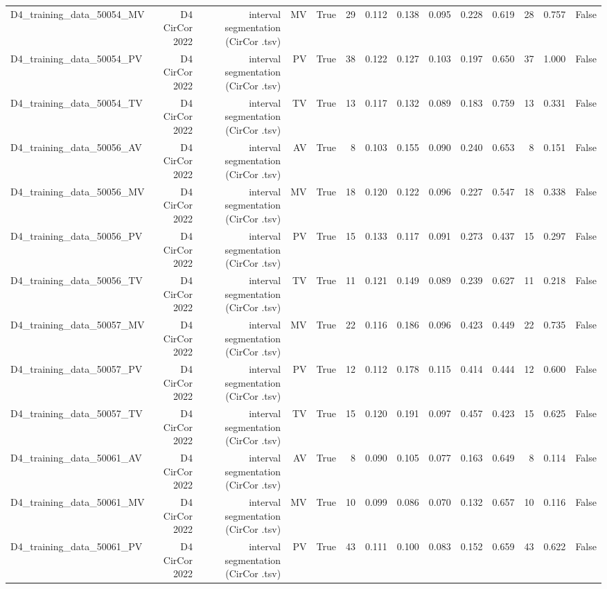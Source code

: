\begin{table}[htbp]
\begin{tabular}{lrrrrrrrrrrrrr}
    D4\_training\_data\_50054\_MV & D4 CirCor 2022 & interval segmentation (CirCor .tsv) & MV & True & 29 & 0.112 & 0.138 & 0.095 & 0.228 & 0.619 & 28 & 0.757 & False \\
    D4\_training\_data\_50054\_PV & D4 CirCor 2022 & interval segmentation (CirCor .tsv) & PV & True & 38 & 0.122 & 0.127 & 0.103 & 0.197 & 0.650 & 37 & 1.000 & False \\
    D4\_training\_data\_50054\_TV & D4 CirCor 2022 & interval segmentation (CirCor .tsv) & TV & True & 13 & 0.117 & 0.132 & 0.089 & 0.183 & 0.759 & 13 & 0.331 & False \\
    D4\_training\_data\_50056\_AV & D4 CirCor 2022 & interval segmentation (CirCor .tsv) & AV & True & 8 & 0.103 & 0.155 & 0.090 & 0.240 & 0.653 & 8 & 0.151 & False \\
    D4\_training\_data\_50056\_MV & D4 CirCor 2022 & interval segmentation (CirCor .tsv) & MV & True & 18 & 0.120 & 0.122 & 0.096 & 0.227 & 0.547 & 18 & 0.338 & False \\
    D4\_training\_data\_50056\_PV & D4 CirCor 2022 & interval segmentation (CirCor .tsv) & PV & True & 15 & 0.133 & 0.117 & 0.091 & 0.273 & 0.437 & 15 & 0.297 & False \\
    D4\_training\_data\_50056\_TV & D4 CirCor 2022 & interval segmentation (CirCor .tsv) & TV & True & 11 & 0.121 & 0.149 & 0.089 & 0.239 & 0.627 & 11 & 0.218 & False \\
    D4\_training\_data\_50057\_MV & D4 CirCor 2022 & interval segmentation (CirCor .tsv) & MV & True & 22 & 0.116 & 0.186 & 0.096 & 0.423 & 0.449 & 22 & 0.735 & False \\
    D4\_training\_data\_50057\_PV & D4 CirCor 2022 & interval segmentation (CirCor .tsv) & PV & True & 12 & 0.112 & 0.178 & 0.115 & 0.414 & 0.444 & 12 & 0.600 & False \\
    D4\_training\_data\_50057\_TV & D4 CirCor 2022 & interval segmentation (CirCor .tsv) & TV & True & 15 & 0.120 & 0.191 & 0.097 & 0.457 & 0.423 & 15 & 0.625 & False \\
    D4\_training\_data\_50061\_AV & D4 CirCor 2022 & interval segmentation (CirCor .tsv) & AV & True & 8 & 0.090 & 0.105 & 0.077 & 0.163 & 0.649 & 8 & 0.114 & False \\
    D4\_training\_data\_50061\_MV & D4 CirCor 2022 & interval segmentation (CirCor .tsv) & MV & True & 10 & 0.099 & 0.086 & 0.070 & 0.132 & 0.657 & 10 & 0.116 & False \\
    D4\_training\_data\_50061\_PV & D4 CirCor 2022 & interval segmentation (CirCor .tsv) & PV & True & 43 & 0.111 & 0.100 & 0.083 & 0.152 & 0.659 & 43 & 0.622 & False \\

\end{tabular}
\end{table}

